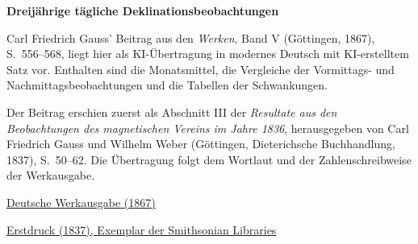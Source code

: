 \clearpage
\thispagestyle{empty}
\begin{center}\Large\textbf{Dreijährige tägliche Deklinationsbeobachtungen}\end{center}

Carl Friedrich Gauss’ Beitrag aus den \textit{Werken}, Band V (Göttingen, 1867), S.~556--568, liegt hier als KI-Übertragung in modernes Deutsch mit KI-erstelltem Satz vor. Enthalten sind die Monatsmittel, die Vergleiche der Vormittags- und Nachmittagsbeobachtungen und die Tabellen der Schwankungen.

Der Beitrag erschien zuerst als Abschnitt III der \textit{Resultate aus den Beobachtungen des magnetischen Vereins im Jahre 1836}, herausgegeben von Carl Friedrich Gauss und Wilhelm Weber (Göttingen, Dieterichsche Buchhandlung, 1837), S.~50--62. Die Übertragung folgt dem Wortlaut und der Zahlenschreibweise der Werkausgabe.

\medskip\noindent
\href{https://gdz.sub.uni-goettingen.de/id/PPN236006339}{Deutsche Werkausgabe (1867)}\par
\noindent\href{https://archive.org/details/ResultateausdenBd1Gaus/page/n55/mode/2up}{Erstdruck (1837), Exemplar der Smithsonian Libraries}
\clearpage
